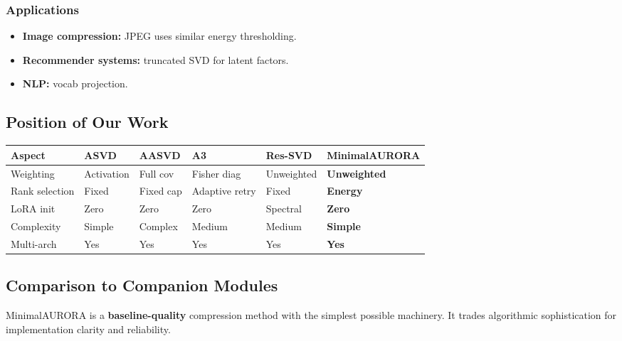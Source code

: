\subsubsection{Applications}

\begin{itemize}
\item \textbf{Image compression:} JPEG uses similar energy thresholding.
\item \textbf{Recommender systems:} truncated SVD for latent factors.
\item \textbf{NLP:} vocab projection.

\end{itemize}
\subsection{Position of Our Work}

\begin{table}[H]
\centering
\small
\begin{tabular}{llllll}
\toprule
\textbf{Aspect} & \textbf{ASVD} & \textbf{AASVD} & \textbf{A3} & \textbf{Res-SVD} & \textbf{MinimalAURORA} \\
\midrule
Weighting & Activation & Full cov & Fisher diag & Unweighted & \textbf{Unweighted} \\
Rank selection & Fixed & Fixed cap & Adaptive retry & Fixed & \textbf{Energy} \\
LoRA init & Zero & Zero & Zero & Spectral & \textbf{Zero} \\
Complexity & Simple & Complex & Medium & Medium & \textbf{Simple} \\
Multi-arch & Yes & Yes & Yes & Yes & \textbf{Yes} \\
\bottomrule
\end{tabular}
\end{table}

\subsection{Comparison to Companion Modules}

MinimalAURORA is a \textbf{baseline-quality} compression method with the 
simplest possible machinery. It trades algorithmic sophistication for 
implementation clarity and reliability.

